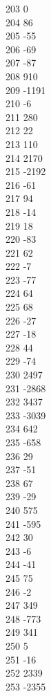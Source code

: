 { 203	0 \\
 204	86 \\
 205	-55 \\
 206	-69 \\
 207	-87 \\
 208	910 \\
 209	-1191 \\
 210	-6 \\
 211	280 \\
 212	22 \\
 213	110 \\
 214	2170 \\
 215	-2192 \\
 216	-61 \\
 217	94 \\
 218	-14 \\
 219	18 \\
 220	-83 \\
 221	62 \\
 222	-7 \\
 223	-77 \\
 224	64 \\
 225	68 \\
 226	-27 \\
 227	-18 \\
 228	44 \\
 229	-74 \\
 230	2497 \\
 231	-2868 \\
 232	3437 \\
 233	-3039 \\
 234	642 \\
 235	-658 \\
 236	29 \\
 237	-51 \\
 238	67 \\
 239	-29 \\
 240	575 \\
 241	-595 \\
 242	30 \\
 243	-6 \\
 244	-41 \\
 245	75 \\
 246	-2 \\
 247	349 \\
 248	-773 \\
 249	341 \\
 250	5 \\
 251	-16 \\
 252	2339 \\
 253	-2355 \\
}

